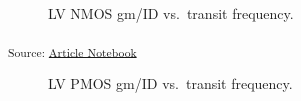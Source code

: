 \documentclass[
  a4paper,
  DIV=11,
  numbers=noendperiod]{scrartcl}
\begin{document}
\begin{figure}[H]


\caption{\label{fig-nmos-gmid-vs-ft}LV NMOS gm/ID vs.~transit
frequency.}

\end{figure}%

\textsubscript{Source:
\href{https://iic-jku.github.io/analog-circuit-design/index.qmd.html}{Article
Notebook}}

\begin{figure}[H]


\caption{\label{fig-pmos-gmid-vs-ft}LV PMOS gm/ID vs.~transit
frequency.}

\end{figure}%
\end{document}
